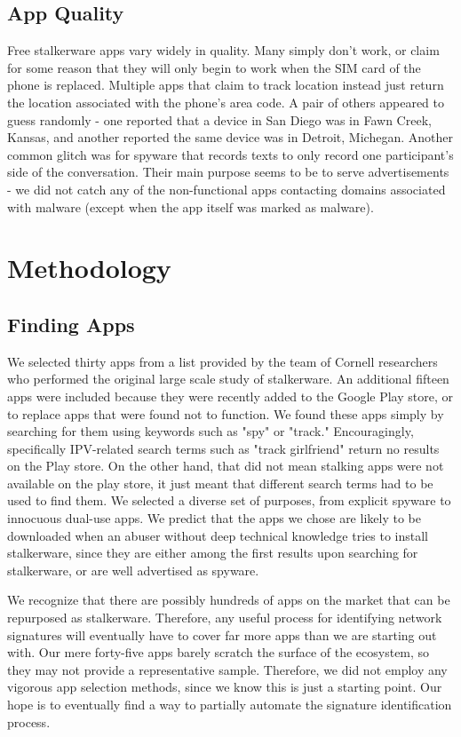 \documentclass[acmtog]{acmart}
\begin{document}
\subsection{App Quality}

Free stalkerware apps vary widely in quality. Many simply don't work, or claim 
for some reason that they will only begin to work when the SIM card of the 
phone is replaced. Multiple apps that claim to track location instead just 
return the location associated with the phone's area code. A pair of others 
appeared to guess randomly - one reported that a device in San Diego was in 
Fawn Creek, Kansas, and another reported the same device was in Detroit, 
Michegan. Another common glitch was for spyware that records texts to only 
record one participant's side of the conversation. Their main purpose seems to 
be to serve advertisements - we did not 
catch any of the non-functional apps contacting domains associated with malware 
(except when the app itself was marked as malware). 

\section{Methodology}

\subsection{Finding Apps}
We selected thirty apps from a list provided by the team of Cornell researchers 
who performed the original large scale study of 
stalkerware\cite{chatterjee_spyware_2018}. An 
additional fifteen apps were included because they were recently added to the 
Google Play store, or to replace apps that were found not to function. We found 
these apps simply by searching for them using keywords such as "spy" or 
"track." Encouragingly, specifically IPV-related search terms 
such as "track girlfriend" return no results on the Play store. On the other 
hand, that did not mean stalking apps were not available on the play store, it 
just meant that different search terms had to be used to find them. We selected 
a diverse set of purposes, from explicit spyware to innocuous dual-use apps. We 
predict that the apps we chose are likely to be 
downloaded when an abuser without deep technical knowledge tries to install 
stalkerware, since they are either among the first results upon searching for 
stalkerware, or are well advertised as spyware.

We recognize that there are possibly hundreds of apps on the market that can be 
repurposed as stalkerware. Therefore, any useful process for identifying 
network signatures will eventually have to cover far more apps than we are 
starting out with. Our mere forty-five apps barely scratch the surface of the 
ecosystem, so they may not provide a representative sample. Therefore, 
we did not employ any vigorous app selection methods, since we know this is 
just a starting point. Our hope is to eventually find a way to partially 
automate the signature identification process.
\end{document}
